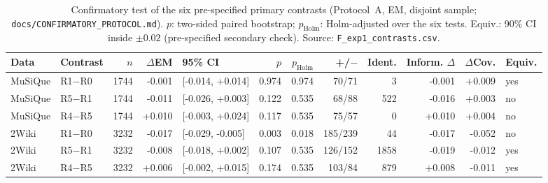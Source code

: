 \begin{table}[t]
\centering
\footnotesize
\begin{tabular}{@{}llrrlrrrrrrl@{}}
\toprule
Data & Contrast & $n$ & $\Delta$EM & 95\% CI & $p$ & $p_{\text{Holm}}$ & +/$-$ & Ident. & Inform. $\Delta$ & $\Delta$Cov. & Equiv. \\
\midrule
MuSiQue & R1$-$R0 & 1744 & -0.001 & [-0.014, +0.014] & 0.974 & 0.974 & 70/71 & 3 & -0.001 & +0.009 & yes \\
MuSiQue & R5$-$R1 & 1744 & -0.011 & [-0.026, +0.003] & 0.122 & 0.535 & 68/88 & 522 & -0.016 & +0.003 & no \\
MuSiQue & R4$-$R5 & 1744 & +0.010 & [-0.003, +0.024] & 0.117 & 0.535 & 75/57 & 0 & +0.010 & +0.004 & no \\
2Wiki & R1$-$R0 & 3232 & -0.017 & [-0.029, -0.005] & 0.003 & 0.018 & 185/239 & 44 & -0.017 & -0.052 & no \\
2Wiki & R5$-$R1 & 3232 & -0.008 & [-0.018, +0.002] & 0.107 & 0.535 & 126/152 & 1858 & -0.019 & -0.012 & yes \\
2Wiki & R4$-$R5 & 3232 & +0.006 & [-0.002, +0.015] & 0.174 & 0.535 & 103/84 & 879 & +0.008 & -0.011 & yes \\
\bottomrule
\end{tabular}
\caption{Confirmatory test of the six pre-specified primary contrasts (Protocol~A, EM, disjoint sample; \texttt{docs/CONFIRMATORY\_PROTOCOL.md}). $p$: two-sided paired bootstrap; $p_{\text{Holm}}$: Holm-adjusted over the six tests. Equiv.: 90\% CI inside $\pm0.02$ (pre-specified secondary check). Source: \texttt{F\_exp1\_contrasts.csv}.}
\label{tab:confirmatory}
\end{table}
